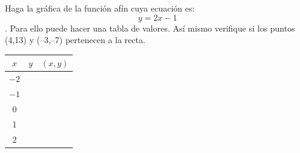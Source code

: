 \documentclass[fleqn]{article}
\begin{document}
\begin{enumerate}
\begin{minipage}{.3\textwidth}
\item Haga la gráfica de la función afín cuya ecuación es: \[y=2x-1\]. Para ello puede hacer una tabla de valores. Así mismo verifique si los puntos (4,13) y (--3,--7) pertenecen a la recta.
\end{minipage}
\begin{minipage}{.4\textwidth}
\end{minipage}
\begin{minipage}{.3\textwidth}
\begin{tabular}{|c|c|c|}
\hline 
$x$ & $y$ & $(x,y)$ \\ 
\hline 
$-2$ &  &  \\ 
\hline 
$-1$ &  &  \\ 
\hline 
0 &  &  \\ 
\hline 
1 &  &  \\ 
\hline 
2 &  &  \\ 
\hline 
\end{tabular} 
\end{minipage}\noanswer


\end{enumerate}
\end{document}
